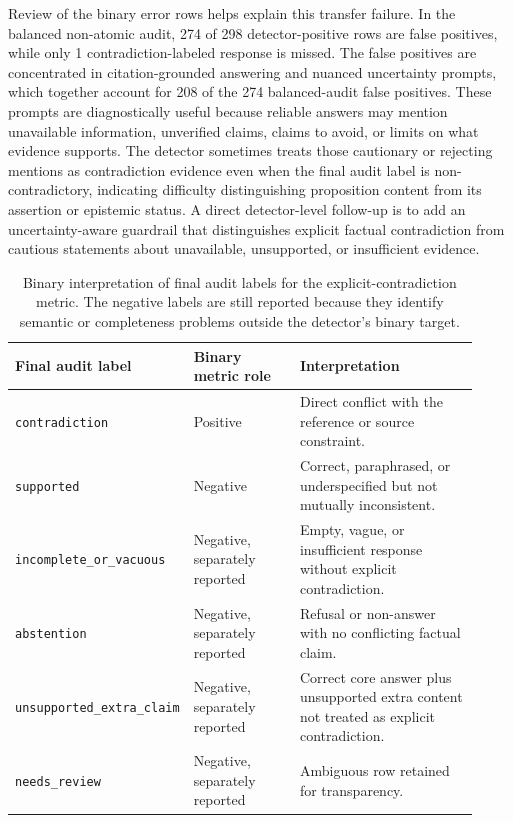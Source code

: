 \documentclass[11pt]{article}
\newcommand{\code}[1]{\texttt{#1}}
\begin{document}
Review of the binary error rows helps explain this transfer failure. In the balanced non-atomic audit, 274 of 298 detector-positive rows are false positives, while only 1 contradiction-labeled response is missed. The false positives are concentrated in citation-grounded answering and nuanced uncertainty prompts, which together account for 208 of the 274 balanced-audit false positives. These prompts are diagnostically useful because reliable answers may mention unavailable information, unverified claims, claims to avoid, or limits on what evidence supports. The detector sometimes treats those cautionary or rejecting mentions as contradiction evidence even when the final audit label is non-contradictory, indicating difficulty distinguishing proposition content from its assertion or epistemic status. A direct detector-level follow-up is to add an uncertainty-aware guardrail that distinguishes explicit factual contradiction from cautious statements about unavailable, unsupported, or insufficient evidence.

\begin{table}[H]
\centering
\small
\caption*{Binary interpretation of final audit labels for the explicit-contradiction metric. The negative labels are still reported because they identify semantic or completeness problems outside the detector's binary target.}
\begin{tabular}{p{0.24\linewidth}p{0.25\linewidth}p{0.43\linewidth}}
\toprule
Final audit label & Binary metric role & Interpretation\\
\midrule
\code{contradiction} & Positive & Direct conflict with the reference or source constraint.\\
\code{supported} & Negative & Correct, paraphrased, or underspecified but not mutually inconsistent.\\
\code{incomplete\_or\_vacuous} & Negative, separately reported & Empty, vague, or insufficient response without explicit contradiction.\\
\code{abstention} & Negative, separately reported & Refusal or non-answer with no conflicting factual claim.\\
\code{unsupported\_extra\_claim} & Negative, separately reported & Correct core answer plus unsupported extra content not treated as explicit contradiction.\\
\code{needs\_review} & Negative, separately reported & Ambiguous row retained for transparency.\\
\bottomrule
\end{tabular}
\end{table}
\end{document}

